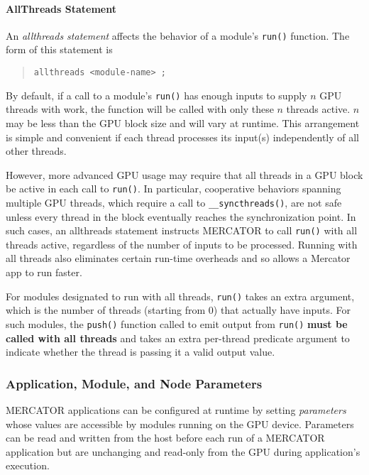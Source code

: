 \documentclass[11pt]{article}
\begin{document}
\paragraph*{AllThreads Statement}
An \emph{allthreads statement} affects the behavior of a module's
\texttt{run()} function.  The form of this statement is
\begin{quote}
\texttt{allthreads <module-name> ;}
\end{quote}

By default, if a call to a module's \texttt{run()} has enough inputs
to supply $n$ GPU threads with work, the function will be called with
only these $n$ threads active.  $n$ may be less than the GPU block
size and will vary at runtime.  This arrangement is simple and
convenient if each thread processes its input(s) independently of all
other threads. 

However, more advanced GPU usage may require that all threads in a GPU
block be active in each call to \texttt{run()}.  In particular,
cooperative behaviors spanning multiple GPU threads, which require a
call to \texttt{__syncthreads()}, are not safe unless every thread in
the block eventually reaches the synchronization point.  In such
cases, an allthreads statement instructs MERCATOR to call
\texttt{run()} with all threads active, regardless of the number of
inputs to be processed.  Running with all threads also eliminates
certain run-time overheads and so allows a Mercator app to run faster.

For modules designated to run with all threads, \texttt{run()} takes
an extra argument, which is the number of threads (starting from 0)
that actually have inputs.  For such modules, the \texttt{push()}
function called to emit output from \texttt{run()} \textbf{must be
  called with all threads} and takes an extra per-thread predicate
argument to indicate whether the thread is passing it a valid output
value.

\subsubsection{Application, Module, and Node Parameters}

MERCATOR applications can be configured at runtime by setting
\emph{parameters} whose values are accessible by modules running on
the GPU device.  Parameters can be read and written from the host
before each run of a MERCATOR application but are unchanging and
read-only from the GPU during application's execution.
\end{document}
